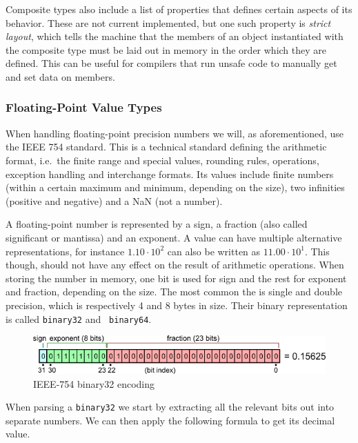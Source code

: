Composite types also include a list of properties that defines certain aspects
of its behavior. These are not current implemented, but one such property is
{\em strict layout}, which tells the machine that the members of an object
instantiated with the composite type must be laid out in memory in the order
which they are defined. This can be useful for compilers that run unsafe code to
manually get and set data on members.

\subsubsection{Floating-Point Value Types}

When handling floating-point precision numbers we will, as aforementioned, use
the IEEE 754 standard\cite{ieee754}. This is a technical standard defining the
arithmetic format, i.e.~the finite range and special values, rounding rules,
operations, exception handling and interchange formats. Its values include
finite numbers (within a certain maximum and minimum, depending on the size),
two infinities (positive and negative) and a NaN (not a number).

A floating-point number is represented by a sign, a fraction (also called
significant or mantissa) and an exponent. A value can have multiple alternative
representations, for instance $1.10 \cdot 10^2$ can also be written as
$11.00 \cdot 10^1$. This though, should not have any effect on the result of
arithmetic operations. When storing the number in memory, one bit is used for
sign and the rest for exponent and fraction, depending on the size. The most
common the is single and double precision, which is respectively 4 and 8 bytes
in size. Their binary representation is called {\tt binary32} and {\tt
  binary64}.

\begin{figure}[H]
  \centering
  \includegraphics[scale=0.7]{images/ieee32.png}
  \caption[Caption for LOF]{IEEE-754 binary32 encoding\footnotemark}
\end{figure}

When parsing a {\tt binary32} we start by extracting all the relevant bits out
into separate numbers. We can then apply the following formula to get its
decimal value.

